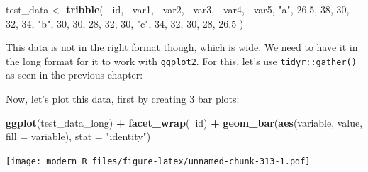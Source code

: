 \documentclass[]{gitbook}
\newenvironment{Shaded}{\begin{snugshade}}{\end{snugshade}}
\newcommand{\DataTypeTok}[1]{\textcolor[rgb]{0.13,0.29,0.53}{#1}}
\newcommand{\DecValTok}[1]{\textcolor[rgb]{0.00,0.00,0.81}{#1}}
\newcommand{\FloatTok}[1]{\textcolor[rgb]{0.00,0.00,0.81}{#1}}
\newcommand{\KeywordTok}[1]{\textcolor[rgb]{0.13,0.29,0.53}{\textbf{#1}}}
\newcommand{\NormalTok}[1]{#1}
\newcommand{\OperatorTok}[1]{\textcolor[rgb]{0.81,0.36,0.00}{\textbf{#1}}}
\newcommand{\StringTok}[1]{\textcolor[rgb]{0.31,0.60,0.02}{#1}}
\theoremstyle{definition}
\theoremstyle{definition}
\theoremstyle{definition}
\theoremstyle{remark}
\begin{document}
\begin{Shaded}
\begin{Highlighting}[]
\NormalTok{test_data <-}\StringTok{ }\KeywordTok{tribble}\NormalTok{(}
  \OperatorTok{~}\NormalTok{id, }\OperatorTok{~}\NormalTok{var1, }\OperatorTok{~}\NormalTok{var2,  }\OperatorTok{~}\NormalTok{var3, }\OperatorTok{~}\NormalTok{var4, }\OperatorTok{~}\NormalTok{var5,}
  \StringTok{"a"}\NormalTok{, }\FloatTok{26.5}\NormalTok{, }\DecValTok{38}\NormalTok{, }\DecValTok{30}\NormalTok{, }\DecValTok{32}\NormalTok{, }\DecValTok{34}\NormalTok{,}
  \StringTok{"b"}\NormalTok{, }\DecValTok{30}\NormalTok{, }\DecValTok{30}\NormalTok{, }\DecValTok{28}\NormalTok{, }\DecValTok{32}\NormalTok{, }\DecValTok{30}\NormalTok{,}
  \StringTok{"c"}\NormalTok{, }\DecValTok{34}\NormalTok{, }\DecValTok{32}\NormalTok{, }\DecValTok{30}\NormalTok{, }\DecValTok{28}\NormalTok{, }\FloatTok{26.5}
\NormalTok{)}
\end{Highlighting}
\end{Shaded}

This data is not in the right format though, which is wide. We need to
have it in the long format for it to work with \texttt{ggplot2}. For
this, let's use \texttt{tidyr::gather()} as seen in the previous
chapter:

\begin{Shaded}
\end{Shaded}

Now, let's plot this data, first by creating 3 bar plots:

\begin{Shaded}
\begin{Highlighting}[]
\KeywordTok{ggplot}\NormalTok{(test_data_long) }\OperatorTok{+}
\StringTok{  }\KeywordTok{facet_wrap}\NormalTok{(}\OperatorTok{~}\NormalTok{id) }\OperatorTok{+}
\StringTok{  }\KeywordTok{geom_bar}\NormalTok{(}\KeywordTok{aes}\NormalTok{(variable, value, }\DataTypeTok{fill =}\NormalTok{ variable), }\DataTypeTok{stat =} \StringTok{"identity"}\NormalTok{)}
\end{Highlighting}
\end{Shaded}

\texttt{[image: modern\_R\_files/figure-latex/unnamed-chunk-313-1.pdf]}
\end{document}
